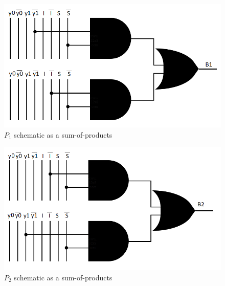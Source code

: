 \documentclass[../../e3_tp3_main.tex]{subfiles}
\begin{document}
\begin{figure}[H]
	\centering
	\includegraphics{figures/mealy_B1_schem.PNG}
	\caption{$P_1$ schematic as a sum-of-products}
	\label{fig:ej1_mealy_P1_schem}
\end{figure}
\begin{figure}[H]
	\centering
	\includegraphics[scale=1]{figures/mealy_B2_schem.PNG}
	\caption{$P_2$ schematic as a sum-of-products}
	\label{fig:ej1_mealy_P2_schem}
\end{figure}
\end{document}
